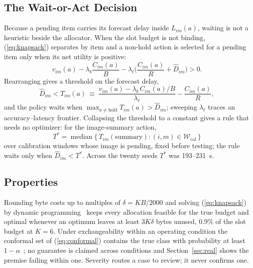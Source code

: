 \subsection{The Wait-or-Act Decision}
\label{sec:wait}
Because a pending item carries its forecast delay inside $L_{im}(a)$, waiting is not a heuristic beside the allocator. When the slot budget is not binding, (\ref{eq:knapsack}) separates by item and a non-hold action is selected for a pending item only when its net utility is positive:
\begin{equation}
v_{im}(a)-\lambda_b\frac{C_{im}(a)}{B}-\lambda_\ell\Big(\frac{C_{im}(a)}{R}+\hat D_{im}\Big)>0.
\end{equation}
Rearranging gives a threshold on the forecast delay,
\begin{equation}
\label{eq:threshold}
\hat D_{im}<T_{im}(a)\ \equiv\ \frac{v_{im}(a)-\lambda_b\,C_{im}(a)/B}{\lambda_\ell}-\frac{C_{im}(a)}{R},
\end{equation}
and the policy waits when $\max_{a\neq\text{hold}}T_{im}(a)>\hat D_{im}$; sweeping $\lambda_\ell$ traces an accuracy--latency frontier. Collapsing the threshold to a constant gives a rule that needs no optimizer: for the image-summary action,
\begin{equation}
\label{eq:tstar}
T^\ast=\operatorname{median}\{\,T_{im}(\text{summary}): (i,m)\in\mathcal W_{\mathrm{cal}}\,\}
\end{equation}
over calibration windows whose image is pending, fixed before testing; the rule waits only when $\hat D_{im}<T^\ast$. Across the twenty seeds $T^\ast$ was 193--231~s.

\subsection{Properties}
Rounding byte costs up to multiples of $\delta=KB/2000$ and solving (\ref{eq:knapsack}) by dynamic programming~\cite{knapsack} keeps every allocation feasible for the true budget and optimal whenever an optimum leaves at least $3K\delta$ bytes unused, 0.9\% of the slot budget at $K=6$. Under exchangeability within an operating condition the conformal set of (\ref{eq:conformal}) contains the true class with probability at least $1-\alpha$~\cite{sadinle}; no guarantee is claimed across conditions and Section~\ref{sec:real} shows the premise failing within one. Severity routes a case to review; it never confirms one.

